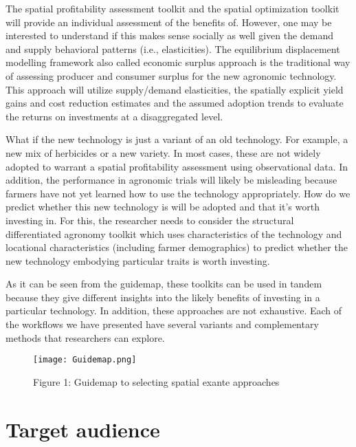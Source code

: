 \documentclass[
  letterpaper,
  DIV=11,
  numbers=noendperiod]{scrreprt}
\begin{document}
The spatial profitability assessment toolkit and the spatial
optimization toolkit will provide an individual assessment of the
benefits of. However, one may be interested to understand if this makes
sense socially as well given the demand and supply behavioral patterns
(i.e., elasticities). The equilibrium displacement modelling framework
also called economic surplus approach is the traditional way of
assessing producer and consumer surplus for the new agronomic
technology. This approach will utilize supply/demand elasticities, the
spatially explicit yield gains and cost reduction estimates and the
assumed adoption trends to evaluate the returns on investments at a
disaggregated level.

What if the new technology is just a variant of an old technology. For
example, a new mix of herbicides or a new variety. In most cases, these
are not widely adopted to warrant a spatial profitability assessment
using observational data. In addition, the performance in agronomic
trials will likely be misleading because farmers have not yet learned
how to use the technology appropriately. How do we predict whether this
new technology is will be adopted and that it's worth investing in. For
this, the researcher needs to consider the structural differentiated
agronomy toolkit which uses characteristics of the technology and
locational characteristics (including farmer demographics) to predict
whether the new technology embodying particular traits is worth
investing.

As it can be seen from the guidemap, these toolkits can be used in
tandem because they give different insights into the likely benefits of
investing in a particular technology. In addition, these approaches are
not exhaustive. Each of the workflows we have presented have several
variants and complementary methods that researchers can explore.

\begin{figure}[H]

{\centering \texttt{[image: Guidemap.png]}

}

\caption{Figure 1: Guidemap to selecting spatial exante approaches}

\end{figure}%

\section{Target audience}\label{target-audience}
\end{document}
